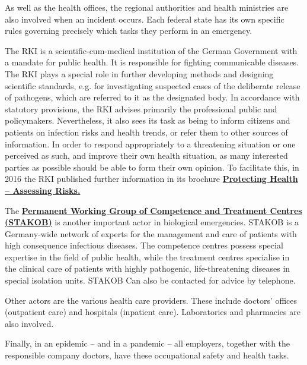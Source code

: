 \documentclass{article}
\begin{document}
As well as the health offices, the regional authorities and health ministries are also involved when an incident occurs. Each federal state has its own specific rules governing precisely which tasks they perform in an emergency.


The RKI is a scientific-cum-medical institution of the German Government with a mandate for public health. It is responsible for fighting communicable diseases. The RKI plays a special role in further developing methods and designing scientific standards, e.g. for investigating suspected cases of the deliberate release of pathogens, which are referred to it as the designated body. In accordance with statutory provisions, the RKI advises primarily the professional public and policymakers. Nevertheless, it also sees its task as being to inform citizens and patients on infection risks and health trends, or refer them to other sources of information. In order to respond appropriately to a threatening situation or one perceived as such, and improve their own health situation, as many interested parties as possible should be able to form their own opinion. To facilitate this, in 2016 the RKI published further information in its brochure \textbf{\href{https://edoc.rki.de/handle/176904/5453}{Protecting Health – Assessing Risks.}}


The \textbf{\href{https://www.rki.de/DE/Content/Kommissionen/Stakob/Stakob_node.html}{Permanent Working Group of Competence and Treatment Centres}}\href{https://www.rki.de/DE/Content/Kommissionen/Stakob/Stakob_node.html}{ }\textbf{\href{https://www.rki.de/DE/Content/Kommissionen/Stakob/Stakob_node.html}{(STAKOB)}}\textbf{ }is another important actor in biological emergencies.\textbf{ }STAKOB is a Germany-wide network of experts for the management and care of patients with high consequence infectious diseases. The competence centres possess special expertise in the field of public health, while the treatment centres specialise in the clinical care of patients with highly pathogenic, life-threatening diseases in special isolation units. STAKOB Can also be contacted for advice by telephone.


Other actors are the various health care providers. These include doctors' offices (outpatient care) and hospitals (inpatient care). Laboratories and pharmacies are also involved.


Finally, in an epidemic – and in a pandemic – all employers, together with the responsible company doctors, have these occupational safety and health tasks.
\end{document}
